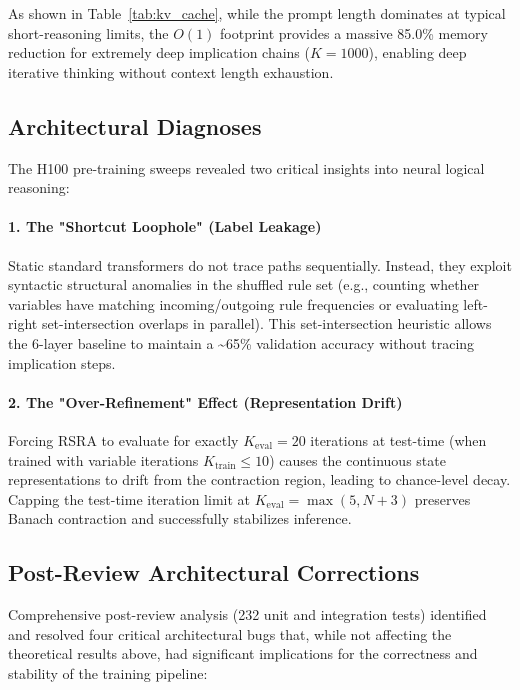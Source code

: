 \documentclass[11pt,a4paper]{article}
\theoremstyle{definition}
\begin{document}
As shown in Table~\ref{tab:kv_cache}, while the prompt length dominates at typical short-reasoning limits, the $O(1)$ footprint provides a massive 85.0\% memory reduction for extremely deep implication chains ($K=1000$), enabling deep iterative thinking without context length exhaustion.

\subsection{Architectural Diagnoses}

The H100 pre-training sweeps revealed two critical insights into neural logical reasoning:

\paragraph{1. The "Shortcut Loophole" (Label Leakage)}
Static standard transformers do not trace paths sequentially. Instead, they exploit syntactic structural anomalies in the shuffled rule set (e.g., counting whether variables have matching incoming/outgoing rule frequencies or evaluating left-right set-intersection overlaps in parallel). This set-intersection heuristic allows the 6-layer baseline to maintain a \textasciitilde 65\% validation accuracy without tracing implication steps.

\paragraph{2. The "Over-Refinement" Effect (Representation Drift)}
Forcing RSRA to evaluate for exactly $K_{\text{eval}}=20$ iterations at test-time (when trained with variable iterations $K_{\text{train}} \le 10$) causes the continuous state representations to drift from the contraction region, leading to chance-level decay. Capping the test-time iteration limit at $K_{\text{eval}} = \max(5, N+3)$ preserves Banach contraction and successfully stabilizes inference.

\subsection{Post-Review Architectural Corrections}

Comprehensive post-review analysis (232 unit and integration tests) identified and resolved four critical architectural bugs that, while not affecting the theoretical results above, had significant implications for the correctness and stability of the training pipeline:
\end{document}
